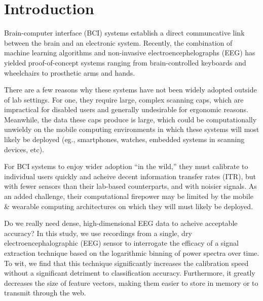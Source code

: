\section{Introduction}


Brain-computer interface (BCI) systems establish a direct communcative link between the brain and an electronic system. \cite{dornhege_toward_2007,mcfarland_brain-computer_2011} Recently, the combination of machine learning algorithms and non-invasive electroencephelographs (EEG) has yielded proof-of-concept systems ranging from brain-controlled keyboards and wheelchairs to prosthetic arms and hands. \cite{blankertz_note_2007,millan_combining_2010,d._mattia_brain_2011,hill_practical_2014,campbell_neurophone:_2010}

There are a few reasons why these systems have not been widely adopted outside of lab settings. For one, they require large, complex scanning caps, which are impractical for disabled users and generally undesirable for ergonomic reasons. \cite{ekandem_evaluating_2012,leeb_transferring_2013} Meanwhile, the data these caps produce is large, which could be computationally unwieldy on the mobile computing environments in which these systems will most likely be deployed (eg., smartphones, watches, embedded systems in scanning devices, etc). 

For BCI systems to enjoy wider adoption ``in the wild,'' they must calibrate to individual users quickly and acheive decent information transfer rates (ITR), but with fewer sensors than their lab-based counterparts, and with noisier signals. As an added challenge, their computational firepower may be limited by the mobile \& wearable computing architectures on which they will must likely be deployed.

Do we really need dense, high-dimensional EEG data to acheive acceptable accuracy? In this study, we use recordings from a single, dry electroencephalographic (EEG) sensor to interrogate the efficacy of a signal extraction technique based on the logarithmic binning of power spectra over time. To wit, we find that this technique significantly increases the calibration speed without a significant detriment to classification accuracy. Furthermore, it greatly decreases the size of feature vectors, making them easier to store in memory or to transmit through the web.
